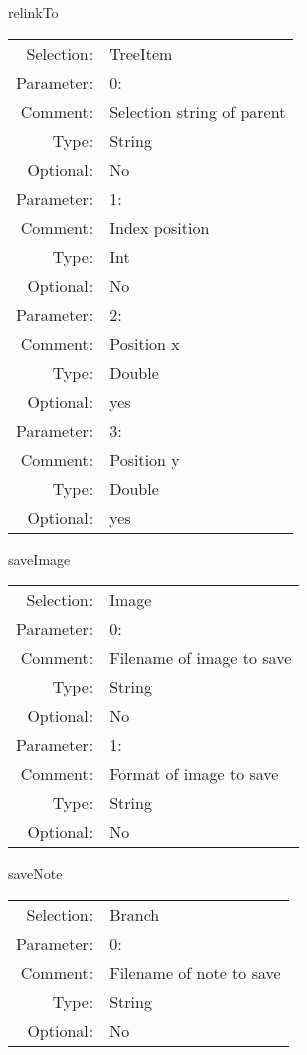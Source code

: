 \item relinkTo\\
\begin{tabular}{rl}
  Selection: & TreeItem\\
   Parameter: &  0:\\
        Comment: & Selection string of parent\\
           Type: & String\\
       Optional: &  No\\
   Parameter: &  1:\\
        Comment: & Index position\\
           Type: & Int\\
       Optional: &  No\\
   Parameter: &  2:\\
        Comment: & Position x\\
           Type: & Double\\
       Optional: &  yes\\
   Parameter: &  3:\\
        Comment: & Position y\\
           Type: & Double\\
       Optional: &  yes\\
\end{tabular}

\item saveImage\\
\begin{tabular}{rl}
  Selection: & Image\\
   Parameter: &  0:\\
        Comment: & Filename of image to save\\
           Type: & String\\
       Optional: &  No\\
   Parameter: &  1:\\
        Comment: & Format of image to save\\
           Type: & String\\
       Optional: &  No\\
\end{tabular}

\item saveNote\\
\begin{tabular}{rl}
  Selection: & Branch\\
   Parameter: &  0:\\
        Comment: & Filename of note to save\\
           Type: & String\\
       Optional: &  No\\
\end{tabular}


